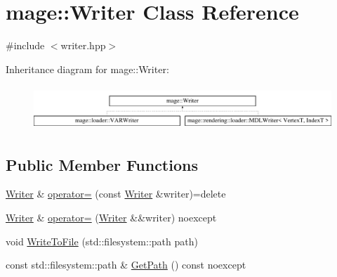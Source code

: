 \hypertarget{classmage_1_1_writer}{}\section{mage\+:\+:Writer Class Reference}
\label{classmage_1_1_writer}


{\ttfamily \#include $<$writer.\+hpp$>$}

Inheritance diagram for mage\+:\+:Writer\+:\begin{figure}[H]
\begin{center}
\leavevmode
\includegraphics[height=1.676647cm]{classmage_1_1_writer}
\end{center}
\end{figure}
\subsection*{Public Member Functions}
\begin{DoxyCompactItemize}
\item 
\mbox{\hyperlink{classmage_1_1_writer}{Writer}} \& \mbox{\hyperlink{classmage_1_1_writer_a81ea888d1b170515713432ca28629ceb}{operator=}} (const \mbox{\hyperlink{classmage_1_1_writer}{Writer}} \&writer)=delete
\item 
\mbox{\hyperlink{classmage_1_1_writer}{Writer}} \& \mbox{\hyperlink{classmage_1_1_writer_a03a93796179f22be90471bea0f7a7cf0}{operator=}} (\mbox{\hyperlink{classmage_1_1_writer}{Writer}} \&\&writer) noexcept
\item 
void \mbox{\hyperlink{classmage_1_1_writer_ac01e930b55888da88e345b0910d4b1c2}{Write\+To\+File}} (std\+::filesystem\+::path path)
\item 
const std\+::filesystem\+::path \& \mbox{\hyperlink{classmage_1_1_writer_ab023ae8174132f233c6e1fa4d3a2a1c8}{Get\+Path}} () const noexcept
\end{DoxyCompactItemize}
